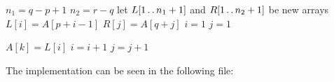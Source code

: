 
\begin{algorithmic}[1]
    \STATE $n_1 = q - p + 1$
    \STATE $n_2 = r - q$
    \STATE let $L[1\mathinner{{\ldotp}\,{\ldotp}} n_1 + 1]$ and $R[1\mathinner{{\ldotp}\,{\ldotp}} n_2 + 1]$ be new arrays
        \STATE $L[i] = A[p + i - 1]$
    \ENDFOR
        \STATE $R[j] = A[q + j]$
    \ENDFOR
    \STATE $i = 1$
    \STATE $j = 1$

            \STATE $A[k] = L[i]$
            \STATE $i = i + 1$
            \STATE $j = j + 1$
        \ENDIF
    \ENDFOR
\end{algorithmic}

The implementation can be seen in the following file:


